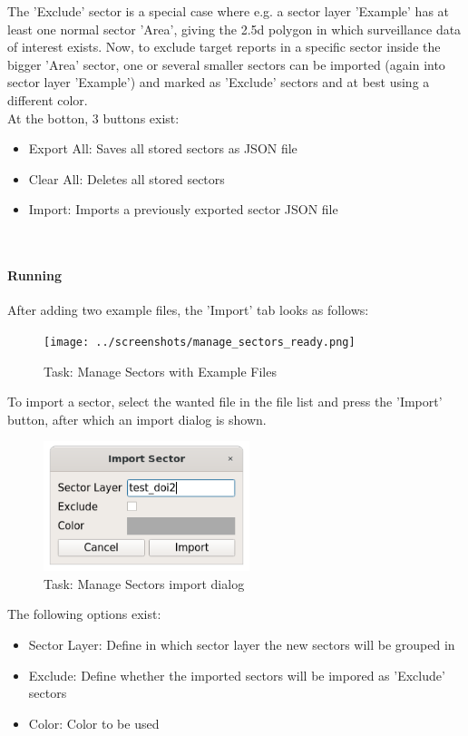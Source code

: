 The 'Exclude' sector is a special case where e.g. a sector layer 'Example' has at least one normal sector 'Area', giving the 2.5d polygon in which surveillance data of interest exists. Now, to exclude target reports in a specific sector inside the bigger 'Area' sector, one or several smaller sectors can be imported (again into sector layer 'Example') and marked as 'Exclude' sectors and at best using a different color. \\

At the botton, 3 buttons exist:

\begin{itemize}  
\item Export All: Saves all stored sectors as JSON file
\item Clear All: Deletes all stored sectors
\item Import: Imports a previously exported sector JSON file
\end{itemize}
\ \\

\paragraph {Running}

After adding two example files, the 'Import' tab looks as follows:

\begin{figure}[H]
    \texttt{[image: ../screenshots/manage\_sectors\_ready.png]}
  \caption{Task: Manage Sectors with Example Files}
\end{figure}

To import a sector, select the wanted file in the file list and press the 'Import' button, after which an import dialog is shown. \\

\begin{figure}[H]
    \includegraphics[width=6cm]{../screenshots/manage_sectors_import_dialog.png}
  \caption{Task: Manage Sectors import dialog}
\end{figure}

The following options exist:
\begin{itemize}  
\item Sector Layer: Define in which sector layer the new sectors will be grouped in
\item Exclude: Define whether the imported sectors will be impored as 'Exclude' sectors
\item Color: Color to be used
\end{itemize}
\ \\

